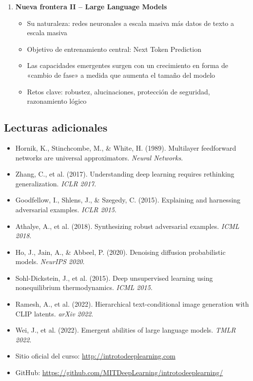 \begin{enumerate}
    \item \textbf{Nueva frontera II -- Large Language Models}
    \begin{itemize}
        \item Su naturaleza: redes neuronales a escala masiva más datos de texto a escala masiva
        \item Objetivo de entrenamiento central: Next Token Prediction
        \item Las capacidades emergentes surgen con un crecimiento en forma de «cambio de fase» a medida que aumenta el tamaño del modelo
        \item Retos clave: robustez, alucinaciones, protección de seguridad, razonamiento lógico
    \end{itemize}
\end{enumerate}

\subsection{Lecturas adicionales}

\begin{itemize}
    \item Hornik, K., Stinchcombe, M., \& White, H. (1989). Multilayer feedforward networks are universal approximators. \textit{Neural Networks}.
    \item Zhang, C., et al. (2017). Understanding deep learning requires rethinking generalization. \textit{ICLR 2017}.
    \item Goodfellow, I., Shlens, J., \& Szegedy, C. (2015). Explaining and harnessing adversarial examples. \textit{ICLR 2015}.
    \item Athalye, A., et al. (2018). Synthesizing robust adversarial examples. \textit{ICML 2018}.
    \item Ho, J., Jain, A., \& Abbeel, P. (2020). Denoising diffusion probabilistic models. \textit{NeurIPS 2020}.
    \item Sohl-Dickstein, J., et al. (2015). Deep unsupervised learning using nonequilibrium thermodynamics. \textit{ICML 2015}.
    \item Ramesh, A., et al. (2022). Hierarchical text-conditional image generation with CLIP latents. \textit{arXiv 2022}.
    \item Wei, J., et al. (2022). Emergent abilities of large language models. \textit{TMLR 2022}.
    \item Sitio oficial del curso: \url{http://introtodeeplearning.com}
    \item GitHub: \url{https://github.com/MITDeepLearning/introtodeeplearning/}
\end{itemize}



